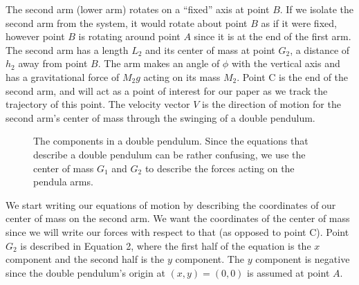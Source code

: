 \documentclass[%
 aip,
 amsmath,amssymb,
 reprint,%
 floatfix,%
]{revtex4-1}
\begin{document}
The second arm (lower arm) rotates on a “fixed” axis at point $B$. If we isolate the second arm from the system, it would rotate about point $B$ as if it were fixed, however point $B$ is rotating around point $A$ since it is at the end of the first arm. The second arm has a length $L_2$ and its center of mass at point $G_2$, a distance of $h_2$ away from point $B$. The arm makes an angle of $\phi$ with the vertical axis and has a gravitational force of $M_2 g$ acting on its mass $M_2$. Point C is the end of the second arm, and will act as a point of interest for our paper as we track the trajectory of this point. The velocity vector $V$ is the direction of motion for the second arm's center of mass through the swinging of a double pendulum. 
\begin{figure}
	\centering
	\caption{The components in a double pendulum. Since the equations that describe a double pendulum can be rather confusing, we use the center of mass $G_1$ and $G_2$ to describe the forces acting on the pendula arms.}
\end{figure}

We start writing our equations of motion by describing the coordinates of our center of mass on the second arm. We want the coordinates of the center of mass since we will write our forces with respect to that (as opposed to point C). Point $G_2$ is described in Equation 2, where the first half of the equation is the $x$ component and the second half is the $y$ component. The $y$ component is negative since the double pendulum's origin at $(x,y)=(0,0)$ is assumed at point $A$.
\end{document}
